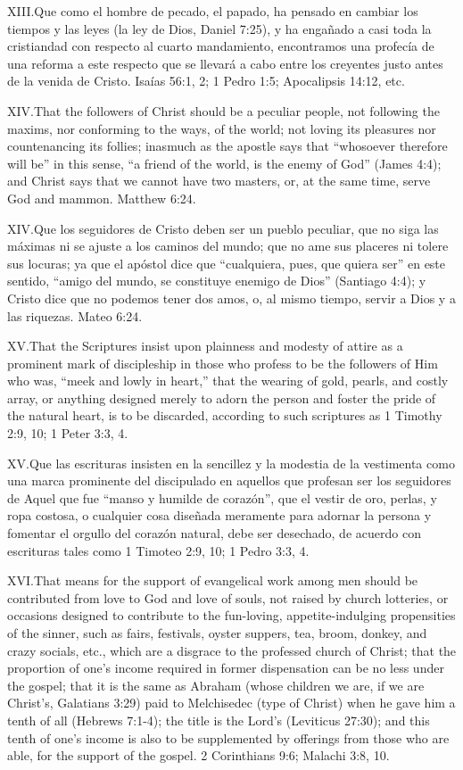 \lettrine{XIII.} Que como el hombre de pecado, el papado, ha pensado en cambiar los tiempos y las leyes (la ley de Dios, Daniel 7:25), y ha engañado a casi toda la cristiandad con respecto al cuarto mandamiento, encontramos una profecía de una reforma a este respecto que se llevará a cabo entre los creyentes justo antes de la venida de Cristo. Isaías 56:1, 2; 1 Pedro 1:5; Apocalipsis 14:12, etc.


\lettrine{XIV.} That the followers of Christ should be a peculiar people, not following the maxims, nor conforming to the ways, of the world; not loving its pleasures nor countenancing its follies; inasmuch as the apostle says that “whosoever therefore will be” in this sense, “a friend of the world, is the enemy of God” (James 4:4); and Christ says that we cannot have two masters, or, at the same time, serve God and mammon. Matthew 6:24.


\lettrine{XIV.} Que los seguidores de Cristo deben ser un pueblo peculiar, que no siga las máximas ni se ajuste a los caminos del mundo; que no ame sus placeres ni tolere sus locuras; ya que el apóstol dice que “cualquiera, pues, que quiera ser” en este sentido, “amigo del mundo, se constituye enemigo de Dios” (Santiago 4:4); y Cristo dice que no podemos tener dos amos, o, al mismo tiempo, servir a Dios y a las riquezas. Mateo 6:24.


\lettrine{XV.} That the Scriptures insist upon plainness and modesty of attire as a prominent mark of discipleship in those who profess to be the followers of Him who was, “meek and lowly in heart,” that the wearing of gold, pearls, and costly array, or anything designed merely to adorn the person and foster the pride of the natural heart, is to be discarded, according to such scriptures as 1 Timothy 2:9, 10; 1 Peter 3:3, 4.


\lettrine{XV.} Que las escrituras insisten en la sencillez y la modestia de la vestimenta como una marca prominente del discipulado en aquellos que profesan ser los seguidores de Aquel que fue “manso y humilde de corazón”, que el vestir de oro, perlas, y ropa costosa, o cualquier cosa diseñada meramente para adornar la persona y fomentar el orgullo del corazón natural, debe ser desechado, de acuerdo con escrituras tales como 1 Timoteo 2:9, 10; 1 Pedro 3:3, 4.


\lettrine{XVI.} That means for the support of evangelical work among men should be contributed from love to God and love of souls, not raised by church lotteries, or occasions designed to contribute to the fun-loving, appetite-indulging propensities of the sinner, such as fairs, festivals, oyster suppers, tea, broom, donkey, and crazy socials, etc., which are a disgrace to the professed church of Christ; that the proportion of one’s income required in former dispensation can be no less under the gospel; that it is the same as Abraham (whose children we are, if we are Christ’s, Galatians 3:29) paid to Melchisedec (type of Christ) when he gave him a tenth of all (Hebrews 7:1-4); the title is the Lord’s (Leviticus 27:30); and this tenth of one’s income is also to be supplemented by offerings from those who are able, for the support of the gospel. 2 Corinthians 9:6; Malachi 3:8, 10.


